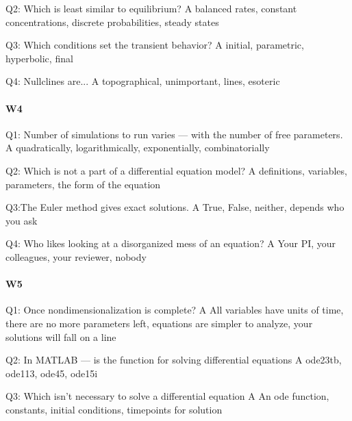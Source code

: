 Q2: Which is least similar to equilibrium?
A balanced rates, constant concentrations, discrete probabilities, steady states

Q3: Which conditions set the transient behavior?
A initial, parametric, hyperbolic, final

Q4: Nullclines are...
A topographical, unimportant, lines, esoteric

\paragraph{W4}
Q1: Number of simulations to run varies --- with the number of free parameters.
A quadratically, logarithmically, exponentially, combinatorially

Q2: Which is not a part of a differential equation model?
A definitions, variables, parameters, the form of the equation

Q3:The Euler method gives exact solutions.
A True, False, neither, depends who you ask

Q4: Who likes looking at a disorganized mess of an equation?
A Your PI, your colleagues, your reviewer, nobody

\paragraph{W5}
Q1: Once nondimensionalization is complete?
A All variables have units of time, there are no more parameters left, equations are simpler to analyze, your solutions will fall on a line

Q2: In MATLAB --- is the function for solving differential equations
A ode23tb, ode113, ode45, ode15i

Q3: Which isn't necessary to solve a differential equation
A An ode function, constants, initial conditions, timepoints for solution

